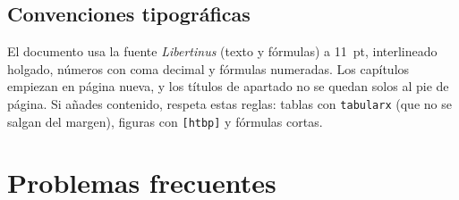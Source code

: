 \documentclass[11pt,a4paper,twoside,openany]{report}
\begin{document}
\section{Convenciones tipográficas}

El documento usa la fuente \emph{Libertinus} (texto y fórmulas) a 11~pt, interlineado holgado, números con coma decimal y fórmulas numeradas. Los capítulos empiezan en página nueva, y los títulos de apartado no se quedan solos al pie de página. Si añades contenido, respeta estas reglas: tablas con \texttt{tabularx} (que no se salgan del margen), figuras con \texttt{[htbp]} y fórmulas cortas.

\chapter{Problemas frecuentes}\label{g:problemas}
\end{document}
